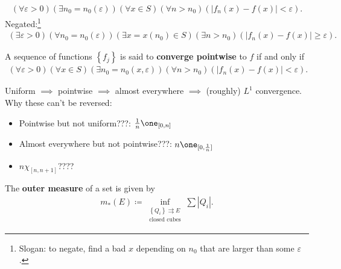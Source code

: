 \begin{definition}

\begin{align*}
(\forall \varepsilon>0)\left(\exists n_{0} = n_0({\varepsilon}) \right)(\forall x \in S)\left(\forall n>n_{0}\right)\left(\left|f_{n}(x)-f(x)\right|<\varepsilon\right)
.\end{align*}
Negated:\footnote{Slogan: to negate, find a bad \(x\) depending on
  \(n_0\) that are larger than some \({\varepsilon}\).}
\begin{align*}  
(\exists \varepsilon>0)\left(\forall n_{0} = n_0 ({\varepsilon}) \right)(\exists x = x(n_0) \in S)\left(\exists n>n_{0}\right)\left(\left|f_{n}(x)-f(x)\right| \geq \varepsilon\right)
.\end{align*}

\end{definition}

\begin{definition}

A sequence of functions \(\left\{{ f_j }\right\}\) is said to
\textbf{converge pointwise} to \(f\) if and only if
\begin{align*}  
(\forall \varepsilon>0)(\forall x \in S)\left(\exists n_{0} = n_0(x, {\varepsilon}) \right)\left(\forall n>n_{0}\right)\left(\left|f_{n}(x)-f(x)\right|<\varepsilon\right)
.\end{align*}

\end{definition}

\begin{proposition}

Uniform \(\implies\) pointwise \(\implies\) almost everywhere
\(\implies\) (roughly) \(L^1\) convergence. Why these can't be reversed:

\begin{itemize}
\tightlist
\item
  Pointwise but not uniform???: \({1\over n}\one_{[0, n]}\)
\item
  Almost everywhere but not pointwise???: \(n \one_{[0, {1\over n} ] }\)
\item
  \(n \chi_{[n, n+1]}\)????
\end{itemize}

\end{proposition}

\begin{definition}

The \textbf{outer measure} of a set is given by
\begin{align*}
m_*(E) \coloneqq\inf_{\substack{\left\{{Q_{i}}\right\} \rightrightarrows E \\ \text{closed cubes}}} \sum {\left\lvert {Q_{i}} \right\rvert}
.\end{align*}

\end{definition}


